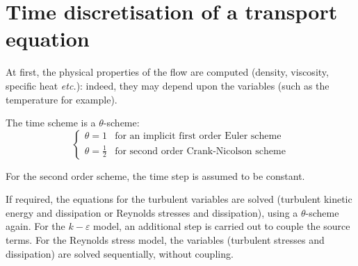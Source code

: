 
%
%
%
%


\section{Time discretisation of a transport equation}

At first, the physical properties of the flow are computed (density,
viscosity, specific heat \emph{etc.}): indeed, they may depend upon the variables
(such as the temperature for example).

The time scheme is a $\theta$-scheme:
\begin{equation}
\left\{%
\begin{array}{ll}
\theta = 1 & \text{for an implicit first order Euler scheme} \\
\theta = \frac{1}{2} & \text{for second order Crank-Nicolson scheme}%
\end{array}
\right.
\end{equation}

For the second order scheme, the time step is assumed to be constant.

If required, the equations for the turbulent variables are solved (turbulent
kinetic energy and dissipation or Reynolds stresses and dissipation), using
a $\theta$-scheme again. For the $k-\varepsilon$ model, an additional step
is carried out to couple the source terms. For the Reynolds stress model,
the variables (turbulent stresses and dissipation) are solved sequentially,
without coupling.

